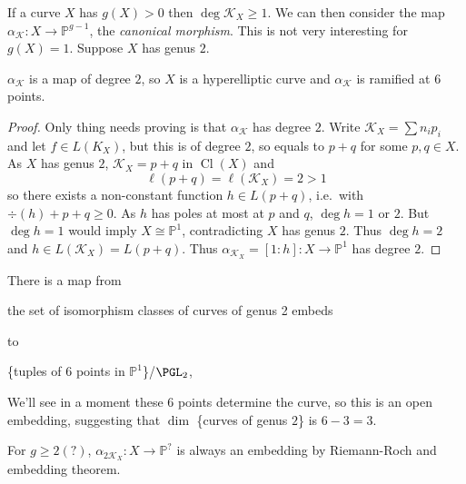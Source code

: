\documentclass[a4paper]{article}
\DeclareMathOperator{\Cl}{Cl}
\renewcommand*{\P}{\mathbb{P}}
\begin{document}
If a curve \(X\) has \(g(X) > 0\) then \(\deg \mathcal K_X \geq 1\). We can then consider the map \(\alpha_{\mathcal K}: X \to \P^{g - 1}\), the \emph{canonical morphism}. This is not very interesting for \(g(X) = 1\). Suppose \(X\) has genus \(2\).

\begin{proposition}
  \(\alpha_{\mathcal K}\) is a map of degree \(2\), so \(X\) is a hyperelliptic curve and \(\alpha_{\mathcal K}\) is ramified at \(6\) points.
\end{proposition}

\begin{proof}
  Only thing needs proving is that \(\alpha_{\mathcal K}\) has degree \(2\). Write \(\mathcal K_X = \sum n_i p_i\) and let \(f \in L(K_X)\), but this is of degree \(2\), so equals to \(p + q\) for some \(p, q \in X\). As \(X\) has genus \(2\), \(\mathcal K_X = p + q\) in \(\Cl(X)\) and
  \[
    \ell(p + q) = \ell(\mathcal K_X) = 2 > 1
  \]
  so there exists a non-constant function \(h \in L(p + q)\), i.e.\ with \(\div (h) + p + q \geq 0\). As \(h\) has poles at most at \(p\) and \(q\), \(\deg h = 1\) or \(2\). But \(\deg h = 1\) would imply \(X \cong \P^1\), contradicting \(X\) has genus \(2\). Thus \(\deg h = 2\) and \(h \in L(\mathcal K_X) = L(p + q)\). Thus \(\alpha_{\mathcal K_X} = [1:h]: X \to \P^1\) has degree \(2\).
\end{proof}

\begin{corollary}
  There is a map from
  
  the set of isomorphism classes of curves of genus 2 embeds

  to

  \{tuples of 6 points in \(\P^1\)\}/\(\PGL_2\),
\end{corollary}
We'll see in a moment these 6 points determine the curve, so this is an open embedding, suggesting that \(\dim\) \{curves of genus \(2\)\} is \(6 - 3 = 3\).

\begin{remark}
  For \(g \geq 2 (?)\), \(\alpha_{2\mathcal K_X}: X \to \P^?\) is always an embedding by Riemann-Roch and embedding theorem.
\end{remark}
\end{document}
